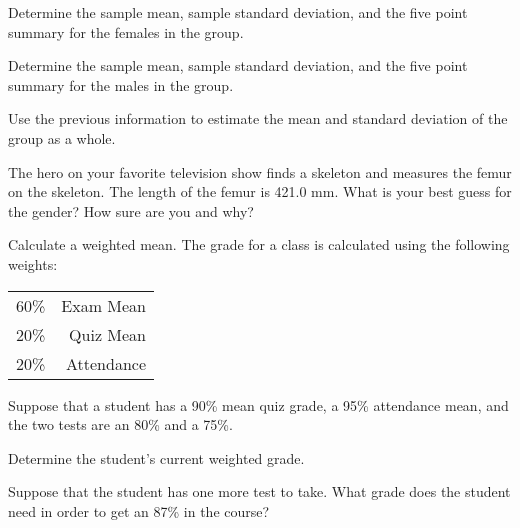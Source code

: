 \begin{problem}
  \begin{subproblem}
  \item Determine the sample mean, sample standard deviation, and the
    five point summary for the females in the group.

    \vfill

  \item Determine the sample mean, sample standard deviation, and the
    five point summary for the males in the group.

    \vfill

  \item Use the previous information to estimate the mean and
    standard deviation of the group as a whole. 

    \vfill

  \item The hero on your favorite television show finds a skeleton and
    measures the femur on the skeleton. The length of the femur is
    421.0 mm. What is your best guess for the gender? How sure are you
    and why?

    \vspace{4em}

  \end{subproblem}

\clearpage

\item Calculate a weighted mean.  The grade for a class is
  calculated using the following weights: \\
  \begin{tabular}{rr}
    60\% & Exam Mean \\
    20\% & Quiz Mean \\
    20\% & Attendance 
  \end{tabular}

  Suppose that a student has a 90\% mean quiz grade, a 95\% attendance
  mean, and the two tests are an 80\% and a 75\%. 

  \begin{subproblem}
  \item Determine the student's current weighted grade.

    \vfill

  \item Suppose that the student has one more test to take. What grade
    does the student need in order to get an 87\% in the course?

    \vfill

  \end{subproblem}


\end{problem}

